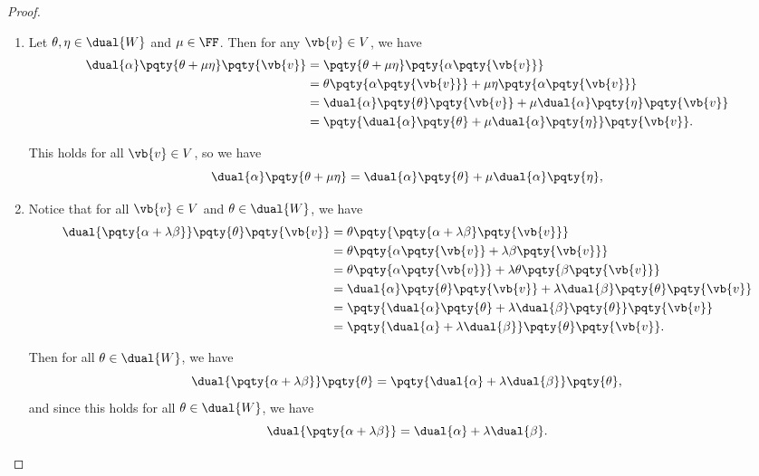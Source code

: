 \begin{proof}
    \begin{enumerate}[label=(\roman*)]
        \item Let \(\theta, \eta \in \dual{W}\) and \(\mu \in \FF\). Then for any \(\vb{v} \in V\), we have
        \begin{align*}
            \dual{\alpha}\pqty{\theta + \mu \eta}\pqty{\vb{v}} &= \pqty{\theta + \mu \eta}\pqty{\alpha\pqty{\vb{v}}} \\
            &= \theta\pqty{\alpha\pqty{\vb{v}}} + \mu \eta\pqty{\alpha\pqty{\vb{v}}} \\
            &= \dual{\alpha}\pqty{\theta}\pqty{\vb{v}} + \mu \dual{\alpha}\pqty{\eta}\pqty{\vb{v}} \\
            &= \pqty{\dual{\alpha}\pqty{\theta} + \mu \dual{\alpha}\pqty{\eta}}\pqty{\vb{v}}.
        \end{align*}

        This holds for all \(\vb{v} \in V\), so we have
        \[
            \dual{\alpha}\pqty{\theta + \mu \eta} = \dual{\alpha}\pqty{\theta} + \mu \dual{\alpha}\pqty{\eta},
        \]

        \item Notice that for all \(\vb{v} \in V\) and \(\theta \in \dual{W}\), we have
        \begin{align*}
            \dual{\pqty{\alpha + \lambda \beta}}\pqty{\theta}\pqty{\vb{v}} &= \theta\pqty{\pqty{\alpha + \lambda \beta}\pqty{\vb{v}}} \\
            &= \theta\pqty{\alpha\pqty{\vb{v}} + \lambda \beta\pqty{\vb{v}}} \\
            &= \theta\pqty{\alpha\pqty{\vb{v}}} + \lambda \theta\pqty{\beta\pqty{\vb{v}}} \\
            &= \dual{\alpha}\pqty{\theta}\pqty{\vb{v}} + \lambda \dual{\beta}\pqty{\theta}\pqty{\vb{v}} \\
            &= \pqty{\dual{\alpha}\pqty{\theta} + \lambda \dual{\beta}\pqty{\theta}}\pqty{\vb{v}} \\
            &= \pqty{\dual{\alpha} + \lambda \dual{\beta}}\pqty{\theta}\pqty{\vb{v}}.
        \end{align*}

        Then for all \(\theta \in \dual{W}\), we have
        \[
            \dual{\pqty{\alpha + \lambda \beta}}\pqty{\theta}= \pqty{\dual{\alpha} + \lambda \dual{\beta}}\pqty{\theta},
        \]
        and since this holds for all \(\theta \in \dual{W}\), we have
        \[
            \dual{\pqty{\alpha + \lambda \beta}} = \dual{\alpha} + \lambda \dual{\beta}.
        \]


\end{enumerate}
\end{proof}
